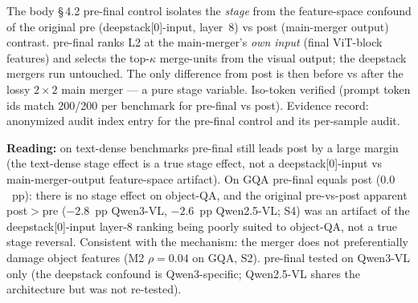 \documentclass[journal]{IEEEtran}
\begin{document}
The body \S\,4.2 pre-final control isolates the \emph{stage} from the
feature-space confound of the original pre (deepstack[0]-input, layer~8) vs
post (main-merger output) contrast. pre-final ranks L2 at the main-merger's
\emph{own input} (final ViT-block features) and selects the top-$\kappa$
merge-units from the visual output; the deepstack mergers run untouched. The
only difference from post is then before vs after the lossy $2\!\times\!2$ main
merger --- a pure stage variable. Iso-token verified (prompt token ids match
200/200 per benchmark for pre-final vs post). Evidence record: anonymized
audit index entry for the pre-final control and its per-sample audit.

\begin{table}[ht]
  \centering
  \scriptsize
  \setlength{\tabcolsep}{2pt}
\end{table}

\noindent\textbf{Reading:} on text-dense benchmarks pre-final still leads post
by a large margin (the text-dense stage effect is a true stage effect, not a
deepstack[0]-input vs main-merger-output feature-space artifact). On GQA
pre-final equals post ($0.0$~pp): there is no stage effect on object-QA, and
the original pre-vs-post apparent post$>$pre ($-2.8$~pp Qwen3-VL,
$-2.6$~pp Qwen2.5-VL; S4) was an artifact of the deepstack[0]-input layer-8
ranking being poorly suited to object-QA, not a true stage reversal. Consistent
with the mechanism: the merger does not preferentially damage object features
(M2 $\rho = 0.04$ on GQA, S2). pre-final tested on Qwen3-VL only (the
deepstack confound is Qwen3-specific; Qwen2.5-VL shares the architecture but
was not re-tested).

\end{document}

